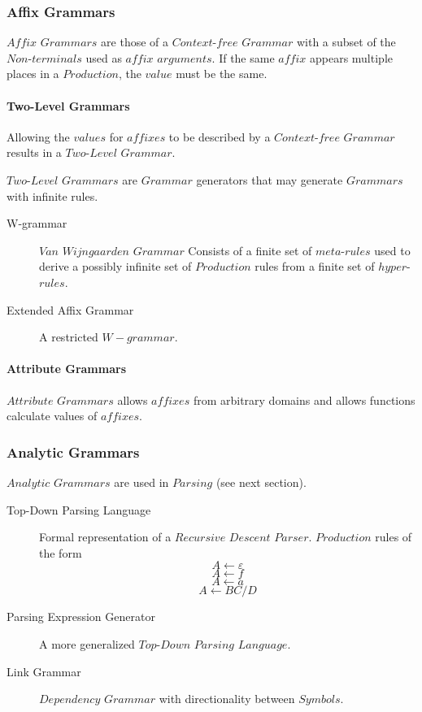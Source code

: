 \documentclass{article}
\begin{document}
\subsubsection{Affix Grammars}

    $Affix$ $Grammars$ are those of a $Context$-$free$ $Grammar$ with
    a subset of the $Non$-$terminals$ used as $affix$ $arguments$. If
    the same $affix$ appears multiple places in a $Production$, the
    $value$ must be the same.

    \paragraph{Two-Level Grammars}
    Allowing the $values$ for $affixes$ to be described by a
    $Context$-$free$ $Grammar$ results in a $Two$-$Level$ $Grammar$.

    $Two$-$Level$ $Grammars$ are $Grammar$ generators that may
    generate $Grammars$ with infinite rules.

    \begin{description}
    \item[W-grammar] $Van$ $Wijngaarden$ $Grammar$
    Consists of a finite set of $meta$-$rules$ used to derive a
    possibly infinite set of $Production$ rules from a finite set of
    $hyper$-$rules$.
    \item[Extended Affix Grammar]
    A restricted $W-grammar$.
    \end{description}

    \paragraph{Attribute Grammars}
    $Attribute$ $Grammars$ allows $affixes$ from arbitrary domains and
    allows functions calculate values of $affixes$.

\subsubsection{Analytic Grammars}

    $Analytic$ $Grammars$ are used in $Parsing$ (see next section).

    \begin{description}
    \item[Top-Down Parsing Language] Formal representation of a
      $Recursive$ $Descent$ $Parser$. $Production$ rules of the form
    \[
        A \leftarrow \varepsilon
    \]\[
        A \leftarrow f
    \]\[
        A \leftarrow a
    \]\[
        A \leftarrow BC/D
    \]
    \item[Parsing Expression Generator]
    A more generalized $Top$-$Down$ $Parsing$ $Language$.
    \item[Link Grammar]
    $Dependency$ $Grammar$ with directionality between $Symbols$.
    \end{description}
\end{document}
